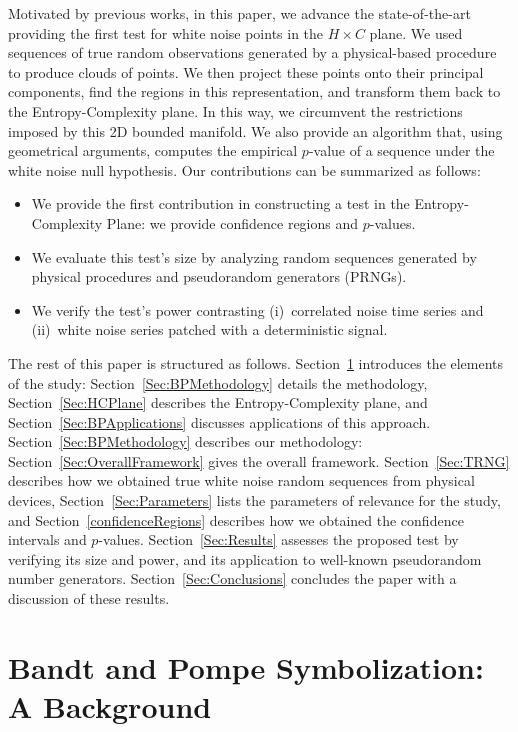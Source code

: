\documentclass[alpha-refs]{wiley-article}
\begin{document}
Motivated by previous works, in this paper, we advance the state-of-the-art providing the first test for white noise points in the $H\times C$ plane.
We used sequences of true random observations generated by a physical-based procedure to produce clouds of points. 
We then project these points onto their principal components, find the regions in this representation, and transform them back to the Entropy-Complexity plane.
In this way, we circumvent the restrictions imposed by this 2D bounded manifold.
We also provide an algorithm that, using geometrical arguments, computes the empirical $p$-value of a sequence under the white noise null hypothesis.
Our contributions can be summarized as follows:
\begin{itemize}
\item We provide the first contribution in constructing a test in the Entropy-Complexity Plane: we provide confidence regions and $p$-values.
\item We evaluate this test's size by analyzing random sequences generated by physical procedures and pseudorandom generators (PRNGs).
\item We verify the test's power contrasting (i)~correlated noise time series and (ii)~white noise series patched with a deterministic signal.
\end{itemize}

The rest of this paper is structured as follows. 
Section~\ref{Sec:BP} introduces the elements of the study:
Section~\ref{Sec:BPMethodology} details the methodology,
Section~\ref{Sec:HCPlane} describes the Entropy-Complexity plane,
and Section~\ref{Sec:BPApplications} discusses applications of this approach.
%
Section~\ref{Sec:BPMethodology} describes our methodology:
Section~\ref{Sec:OverallFramework} gives the overall framework.
Section~\ref{Sec:TRNG} describes how we obtained true white noise random sequences from physical devices,
Section~\ref{Sec:Parameters} lists the parameters of relevance for the study, and
Section~\ref{confidenceRegions} describes how we obtained the confidence intervals and $p$-values.
%
Section~\ref{Sec:Results} assesses the proposed test by verifying its size and power, and its application to well-known pseudorandom number generators.
Section~\ref{Sec:Conclusions} concludes the paper with a discussion of these results.

\section{Bandt and Pompe Symbolization: A Background}\label{Sec:BP}
\end{document}
